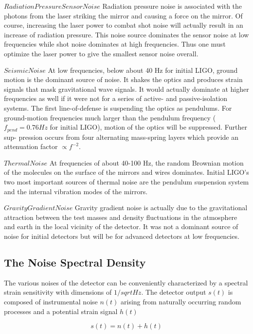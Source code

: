 \documentclass[binding=0.6cm, LaM]{sapthesis}
\begin{document}
	$Radiation Pressure Sensor Noise$
	Radiation pressure noise is associated with the photons from the laser striking the mirror 
	and causing a force on the mirror. Of course, increasing the laser power to combat shot noise 
	will actually result in an increase of radiation pressure. 
	This noise source dominates the sensor noise at low frequencies while shot noise dominates 
	at high frequencies. Thus one must optimize the laser power to give the smallest sensor noise overall.

	$Seismic Noise$
	At low frequencies, below about 40 Hz for initial LIGO, ground motion is the dominant
	source of noise. It shakes the optics and produces strain signals that mask gravitational wave
	signals. It would actually dominate at higher frequencies as well if it were not for a series
	of active- and passive-isolation systems. The first line-of-defense is suspending the optics
	as pendulums. For ground-motion frequencies much larger than the pendulum frequency
	($f_{pend} = 0.76 Hz$ for initial LIGO), motion of the optics will be suppressed. Further sup-
	pression occurs from four alternating mass-spring layers which provide an attenuation factor
	$\propto f^{-2}$.

	$Thermal Noise$
	At frequencies of about 40-100 Hz, the random Brownian motion of the molecules on the surface 
	of the mirrors and wires dominates. Initial LIGO’s two most important sources of thermal noise 
	are the pendulum suspension system and the internal vibration modes of the mirrors.

	$Gravity Gradient Noise$
	Gravity gradient noise is actually due to the gravitational attraction between the test masses 
	and density fluctuations in the atmosphere and earth in the local vicinity of the detector. 
	It was not a dominant source of noise for initial detectors but will be for advanced detectors at low frequencies.

\subsection{The Noise Spectral Density}

	The various noises of the detector can be conveniently characterized by a spectral strain
	sensitivity with dimensions of $1/sqrt{Hz}$.
	The detector output $s(t)$ is composed of instrumental noise $n(t)$ arising from 
	naturally occurring random processes and a potential strain signal $h(t)$

		\begin{equation}
		s(t) = n(t) + h(t)
		\end{equation}
\end{document}
